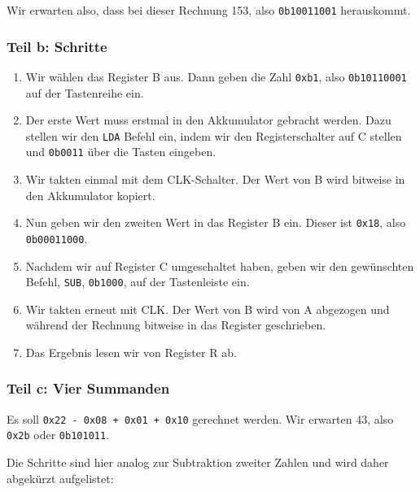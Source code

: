 Wir erwarten also, dass bei dieser Rechnung 153, also \texttt{0b10011001}
herauskommt.

\subsubsection{Teil b: Schritte}

\begin{enumerate}
	\item
		Wir wählen das Register B aus. Dann geben die Zahl \texttt{0xb1}, also
		\texttt{0b10110001} auf der Tastenreihe ein.

	\item
		Der erste Wert muss erstmal in den Akkumulator gebracht werden. Dazu
		stellen wir den \texttt{LDA} Befehl ein, indem wir den Registerschalter
		auf C stellen und \texttt{0b0011} über die Tasten eingeben.

	\item
		Wir takten einmal mit dem CLK-Schalter. Der Wert von B wird bitweise in
		den Akkumulator kopiert.

	\item
		Nun geben wir den zweiten Wert in das Register B ein. Dieser ist
		\texttt{0x18}, also \texttt{0b00011000}.

	\item
		Nachdem wir auf Register C umgeschaltet haben, geben wir den
		gewünschten Befehl, \texttt{SUB}, \texttt{0b1000}, auf der Tastenleiste
		ein.

	\item
		Wir takten erneut mit CLK. Der Wert von B wird von A abgezogen und
		während der Rechnung bitweise in das Register geschrieben.

	\item
		Das Ergebnis lesen wir von Register R ab.
\end{enumerate}

\subsubsection{Teil c: Vier Summanden}

Es soll \texttt{0x22 - 0x08 + 0x01 + 0x10} gerechnet werden. Wir erwarten 43,
also \texttt{0x2b} oder \texttt{0b101011}.

Die Schritte sind hier analog zur Subtraktion zweiter Zahlen und wird daher
abgekürzt aufgelistet:

